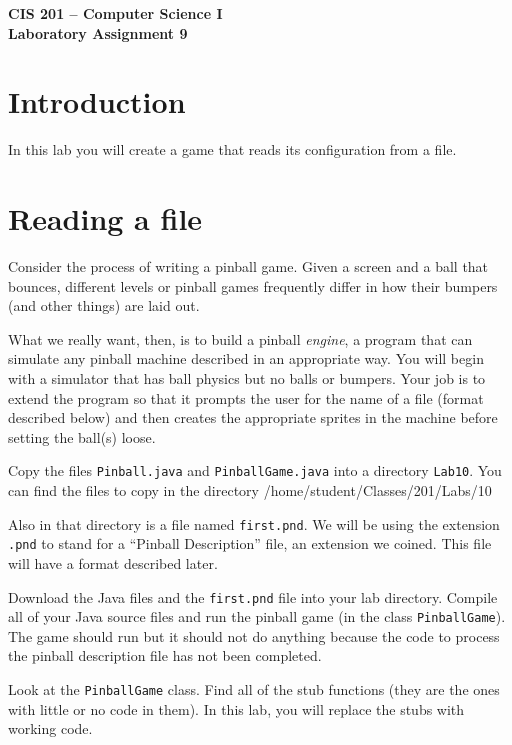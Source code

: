 \documentclass[12pt]{article}
\newenvironment{qv}%
  {\quote
   \verbatim}%
  {\endverbatim
   \endquote}
\newcommand{\code}{\texttt}
\newcommand{\fname}{\texttt}
\begin{document}
\sloppypar

\begin{center}
\Large\bf
CIS 201 -- Computer Science I\\
Laboratory Assignment 9\\
\end{center}

\section*{Introduction}
In this lab you will create a game that reads its configuration
from a file.

\section*{Reading a file}

Consider the process of writing a pinball game. Given a screen and a
ball that bounces, different levels or pinball games frequently differ
in how their bumpers (and other things) are laid out. 

What we really want, then, is to build a pinball \emph{engine}, a
program that can simulate any pinball machine described in an
appropriate way. You will begin with a simulator that has ball physics
but no balls or bumpers. Your job is to extend the program so that it prompts
the user for the name of a file (format described below) and
then creates the appropriate sprites in the machine before setting the
ball(s) loose.

Copy the files \fname{Pinball.java} and
\code{PinballGame.java} into a directory \fname{Lab10}.
You can find the files to copy in the directory
\begin{qv}
/home/student/Classes/201/Labs/10
\end{qv}

Also in that directory is a file named \fname{first.pnd}.
We will be using the extension \fname{.pnd}
to stand for a ``Pinball Description'' file,
an extension we coined.
This file will have a format described later.

Download the Java files and the \fname{first.pnd} file
into your lab directory. Compile all of your Java source files
and run the pinball game (in the class \fname{PinballGame}).
The game should run but it should not do
anything because the code to process the pinball description file
has not been completed. 

Look at the \code{PinballGame} class. Find all of the
stub functions (they are the ones with little or no code in them).
In this lab, you will replace the stubs with working code.
\end{document}
